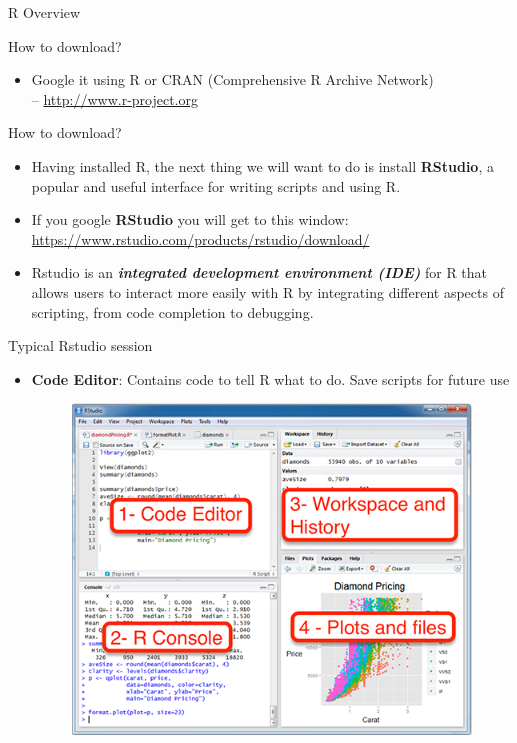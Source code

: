 \documentclass[
  ignorenonframetext,
]{beamer}
\providecommand{\tightlist}{%
  \setlength{\itemsep}{0pt}\setlength{\parskip}{0pt}}
\begin{document}
\begin{frame}{R Overview}
\label{r-overview}
\end{frame}

\begin{frame}{How to download?}
\label{how-to-download}
\begin{itemize}
\tightlist
\item
  Google it using R or CRAN (Comprehensive R Archive Network)\\
  -- \url{http://www.r-project.org}
\end{itemize}
\end{frame}

\begin{frame}{How to download?}
\label{how-to-download-1}
\begin{itemize}
\tightlist
\item
  Having installed R, the next thing we will want to do is install
  \textbf{RStudio}, a popular and useful interface for writing scripts
  and using R.
\end{itemize}

\begin{itemize}
\tightlist
\item
  If you google \textbf{RStudio} you will get to this window:\\
  \url{https://www.rstudio.com/products/rstudio/download/}
\end{itemize}

\begin{itemize}
\tightlist
\item
  Rstudio is an \textbf{\emph{integrated development environment (IDE)}}
  for R that allows users to interact more easily with R by integrating
  different aspects of scripting, from code completion to debugging.
\end{itemize}
\end{frame}

\begin{frame}{Typical Rstudio session}
\label{typical-rstudio-session}
\begin{itemize}
\tightlist
\item
  \textbf{Code Editor}: Contains code to tell R what to do. Save scripts
  for future use

  \begin{figure}
  \includegraphics[width=0.5\linewidth]{fig/Rstudio} \end{figure}
\end{itemize}
\end{frame}
\end{document}
